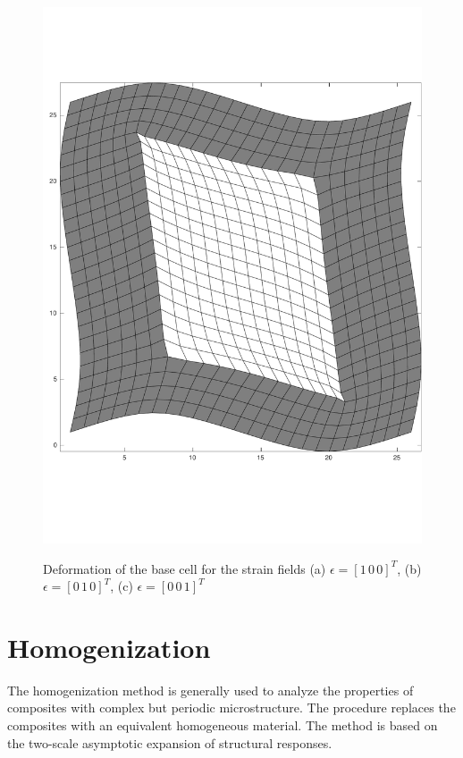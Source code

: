 \documentclass[openright,twoside]{iitkthesis}
\begin{document}
\begin{figure}[H]
\begin{center}
{		\includegraphics[trim=0cm 4cm 0cm 6cm,scale=.22]{./Plots/pbc/3}
     }
	\label{fig:pbc1}
	\caption{Deformation of the base cell for the strain fields (a) $\epsilon = [1\,0\,0]^T$, (b) $\epsilon = [0\,1\,0]^T$, (c) $\epsilon = [0\,0\,1]^T$}
\end{center}
\end{figure}

\section{Homogenization}
The homogenization method is generally used to analyze the properties of composites with complex but periodic microstructure. The procedure replaces the composites with an equivalent homogeneous material. 
The method is based on the two-scale asymptotic expansion of structural responses.
\end{document}
